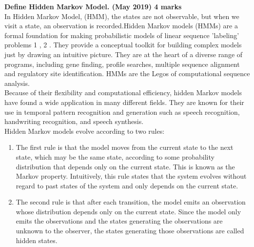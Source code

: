 \textbf{\textcolor{LightMagenta}{Define Hidden Markov Model. (May 2019) \hfill 4 marks}} \\[5pt]
In Hidden Markov Model, (HMM), the states are not observable, but when we
visit a state, an observation is recorded.Hidden Markov models (HMMs) are a formal foundation for making probabilistic models of linear sequence ’labeling’ problems 1 , 2 . They
provide a conceptual toolkit for building complex models just by drawing an intuitive picture. They are at the heart of a diverse range of programs, including gene finding, profile
searches, multiple sequence alignment and regulatory site identification. HMMs are the Legos of computational sequence analysis.\\
Because of their flexibility and computational efficiency, hidden Markov models have found
a wide application in many different fields. They are known for their use in temporal pattern
recognition and generation such as speech recognition, handwriting recognition, and speech
synthesis.\\
Hidden Markov models evolve according to two rules:
\begin{enumerate}
    \item The first rule is that the model moves from the current state to the next state, which
may be the same state, according to some probability distribution that depends only on the
current state. This is known as the Markov property. Intuitively, this rule states that the
system evolves without regard to past states of the system and only depends on the current
state.
\item The second rule is that after each transition, the model emits an observation whose distribution depends only on the current state. Since the model only emits the observations and
the states generating the observations are unknown to the observer, the states generating
those observations are called hidden states.
\end{enumerate}
